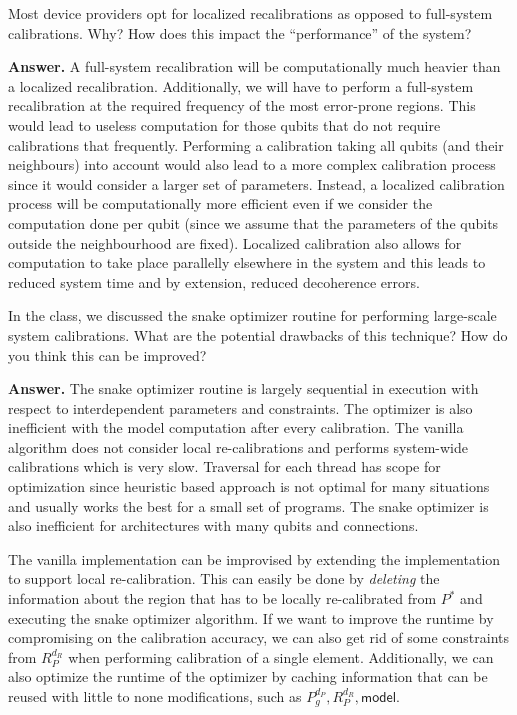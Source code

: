 \tcbline{}

\begin{question}
    Most device providers opt for localized recalibrations as opposed to full-system calibrations. Why? How does this impact the “performance” of the system?
\end{question}
\textbf{Answer.} A full-system recalibration will be computationally much heavier than a localized recalibration. Additionally, we will have to perform a full-system recalibration at the required frequency of the most error-prone regions. This would lead to useless computation for those qubits that do not require calibrations that frequently. Performing a calibration taking all qubits (and their neighbours) into account would also lead to a more complex calibration process since it would consider a larger set of parameters. Instead, a localized calibration process will be computationally more efficient even if we consider the computation done per qubit (since we assume that the parameters of the qubits outside the neighbourhood are fixed). Localized calibration also allows for computation to take place parallelly elsewhere in the system and this leads to reduced system time and by extension, reduced decoherence errors.

\tcbline{}

\begin{question}
    In the class, we discussed the snake optimizer routine for performing large-scale system calibrations. What are the potential drawbacks of this technique? How do you think this can be improved?
\end{question}
\textbf{Answer.} The snake optimizer routine is largely sequential in execution with respect to interdependent parameters and constraints. The optimizer is also inefficient with the model computation after every calibration. The vanilla algorithm does not consider local re-calibrations and performs system-wide calibrations which is very slow. Traversal for each thread has scope for optimization since heuristic based approach is not optimal for many situations and usually works the best for a small set of programs. The snake optimizer is also inefficient for architectures with many qubits and connections.\par
The vanilla implementation can be improvised by extending the implementation to support local re-calibration. This can easily be done by \textit{deleting} the information about the region that has to be locally re-calibrated from $P^*$ and executing the snake optimizer algorithm. If we want to improve the runtime by compromising on the calibration accuracy, we can also get rid of some constraints from $R_P^{d_R}$ when performing calibration of a single element. Additionally, we can also optimize the runtime of the optimizer by caching information that can be reused with little to none modifications, such as $P_g^{d_P}, R_P^{d_R}, \mathsf{model}$.